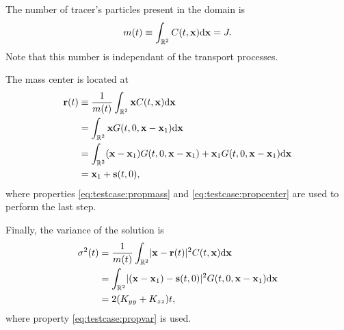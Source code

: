 The number of tracer's particles present in the domain is
\begin{equation}
	m(t) \equiv \int_{\R[2]} C(t,\b x) \rm d \b x = J.
\end{equation}
Note that this number is independant of the transport processes.

The mass center is located at
\begin{align}
	\b r(t) &\equiv \frac{1}{m(t)} \int_{\R[2]} \b x C(t,\b x) \rm d \b x \nonumber \\
	&= \int_{\R[2]} \b x G(t,0,\b x - \b x_1) \rm d \b x \nonumber\\
	&= \int_{\R[2]} (\b x-\b x_1) G(t,0,\b x - \b x_1) + \b x_1 G(t,0,\b x - \b x_1) \rm d \b x\nonumber\\
	&= \b x_1 + \b s(t,0),
\end{align}
where properties \eqref{eq:testcase:propmass} and \eqref{eq:testcase:propcenter} are used to perform the last step.

Finally, the variance of the solution is
\begin{align}
	\sigma^2(t) &= \frac{1}{m(t)} \int_{\R[2]} \lvert \b x - \b r(t) \rvert^2 C(t,\b x) \rm d \b x \nonumber \\
	&= \int_{\R[2]} \lvert (\b x - \b x_1) - \b s(t,0)\rvert^2 G(t,0,\b x - \b x_1) \rm d \b x \nonumber \\
	&= 2(K_{yy}+K_{zz})t,
\end{align}
where property \eqref{eq:testcase:propvar} is used.
